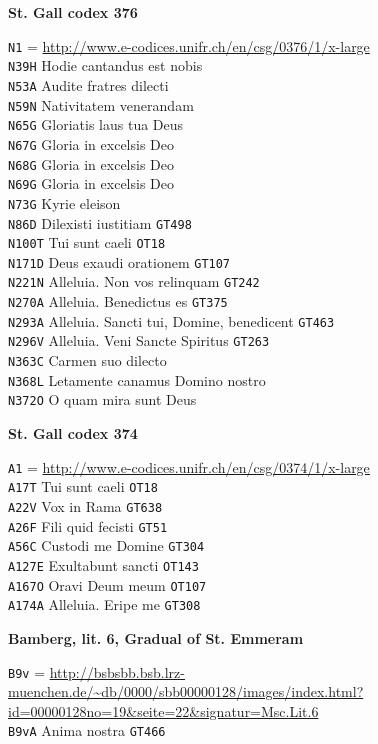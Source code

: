 \documentclass[a4paper]{article}
\begin{document}
{\begin{multicols}{2}
\noindent\textbf{St. Gall codex 376}

\noindent
\texttt{N1} = \url{http://www.e-codices.unifr.ch/en/csg/0376/1/x-large}\\
\texttt{N39H} Hodie cantandus est nobis\\
\texttt{N53A} Audite fratres dilecti\\
\texttt{N59N} Nativitatem venerandam\\
\texttt{N65G} Gloriatis laus tua Deus\\
\texttt{N67G} Gloria in excelsis Deo\\
\texttt{N68G} Gloria in excelsis Deo\\
\texttt{N69G} Gloria in excelsis Deo\\
\texttt{N73G} Kyrie eleison\\
\texttt{N86D} Dilexisti iustitiam \texttt{GT498}\\
\texttt{N100T} Tui sunt caeli \texttt{OT18}\\
\texttt{N171D} Deus exaudi orationem \texttt{GT107}\\
\texttt{N221N} Alleluia. Non vos relinquam \texttt{GT242}\\
\texttt{N270A} Alleluia. Benedictus es \texttt{GT375}\\
\texttt{N293A} Alleluia. Sancti tui, Domine, benedicent \texttt{GT463}\\
\texttt{N296V} Alleluia. Veni Sancte Spiritus \texttt{GT263}\\
\texttt{N363C} Carmen suo dilecto\\
\texttt{N368L} Letamente canamus Domino nostro\\
\texttt{N372O} O quam mira sunt Deus

\noindent\textbf{St. Gall codex 374}

\noindent
\texttt{A1} = \url{http://www.e-codices.unifr.ch/en/csg/0374/1/x-large}\\
\texttt{A17T} Tui sunt caeli \texttt{OT18}\\
\texttt{A22V} Vox in Rama \texttt{GT638}\\
\texttt{A26F} Fili quid fecisti \texttt{GT51}\\
\texttt{A56C} Custodi me Domine \texttt{GT304}\\
\texttt{A127E} Exultabunt sancti \texttt{OT143}\\
\texttt{A167O} Oravi Deum meum \texttt{OT107}\\
\texttt{A174A} Alleluia. Eripe me \texttt{GT308}

\noindent
\textbf{Bamberg, lit. 6, Gradual of St. Emmeram}

\noindent
\texttt{B9v} = \url{http://bsbsbb.bsb.lrz-muenchen.de/~db/0000/sbb00000128/images/index.html?id=00000128no=19&seite=22&signatur=Msc.Lit.6}\\
\texttt{B9vA} Anima nostra \texttt{GT466}

\end{multicols}
}
\end{document}
